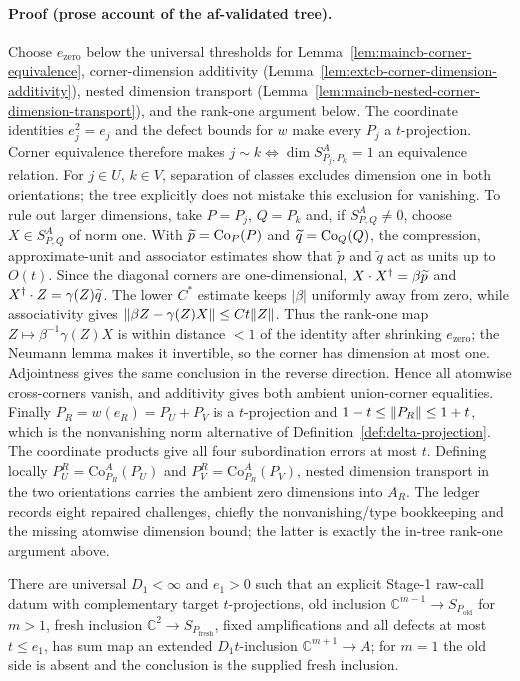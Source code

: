 \paragraph{Proof (prose account of the af-validated tree).}
Choose $e_{\mathrm{zero}}$ below the universal thresholds for
Lemma~\ref{lem:maincb-corner-equivalence}, corner-dimension additivity
(Lemma~\ref{lem:extcb-corner-dimension-additivity}), nested dimension transport
(Lemma~\ref{lem:maincb-nested-corner-dimension-transport}), and the rank-one argument below.
The coordinate identities $e_j^2=e_j$ and the defect bounds for $w$ make every $P_j$ a
$t$-projection.  Corner equivalence therefore makes
$j\sim k\Longleftrightarrow\dim S^A_{P_j,P_k}=1$ an equivalence relation.  For
$j\in U$, $k\in V$, separation of classes excludes dimension one in both orientations;
the tree explicitly does not mistake this exclusion for vanishing.
To rule out larger dimensions, take $P=P_j$, $Q=P_k$ and, if $S^A_{P,Q}\ne0$, choose
$X\in S^A_{P,Q}$ of norm one.  With $\widetilde p=\mathrm{Co}_{P}(P)$ and
$\widetilde q=\mathrm{Co}_{Q}(Q)$, the compression, approximate-unit and associator estimates
show that $\widetilde p$ and $\widetilde q$ act as units up to $O(t)$.  Since the diagonal
corners are one-dimensional, $X\mathbin{\mathbin{\cdot}}X^\dagger=\beta\widetilde p$ and
$X^\dagger\mathbin{\mathbin{\cdot}}Z=\gamma(Z)\widetilde q$.  The lower $C^*$ estimate keeps
$|\beta|$ uniformly away from zero, while associativity gives
$\lVert \beta Z-\gamma(Z)X\rVert\le Ct\lVert Z\rVert$.  Thus the rank-one map
$Z\mapsto\beta^{-1}\gamma(Z)X$ is within distance $<1$ of the identity after shrinking
$e_{\mathrm{zero}}$; the Neumann lemma makes it invertible, so the corner has dimension at
most one.  Adjointness gives the same conclusion in the reverse direction.  Hence all
atomwise cross-corners vanish, and additivity gives both ambient union-corner equalities.
Finally $P_R=w(e_R)=P_U+P_V$ is a $t$-projection and
$1-t\le\lVert P_R\rVert\le1+t$, which is the nonvanishing norm alternative of
Definition~\ref{def:delta-projection}.  The coordinate products give all four
subordination errors at most $t$.  Defining locally
$P_U^R=\mathrm{Co}^{A}_{P_R}(P_U)$ and $P_V^R=\mathrm{Co}^{A}_{P_R}(P_V)$, nested dimension transport in
the two orientations carries the ambient zero dimensions into $A_R$.  The ledger records
eight repaired challenges, chiefly the nonvanishing/type bookkeeping and the missing
atomwise dimension bound; the latter is exactly the in-tree rank-one argument above.
\begin{lemma}\label{lem:maincb-stage1-raw-refinement}
There are universal $D_1<\infty$ and $e_1>0$ such that an explicit Stage-1 raw-call datum with complementary target $t$-projections, old inclusion $\mathbb C^{m-1}\to S_{P_{\mathrm{old}}}$
for $m>1$, fresh inclusion
$\mathbb C^2\to S_{P_{\mathrm{fresh}}}$, fixed amplifications and all defects at most
$t\le e_1$, has sum map an extended $D_1t$-inclusion $\mathbb C^{m+1}\to A$; for $m=1$
the old side is absent and the conclusion is the supplied fresh inclusion.
\end{lemma}
